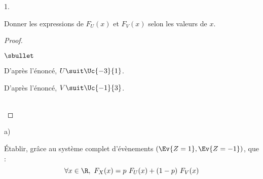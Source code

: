 \documentclass[11pt]{article}%
\begin{document}
\begin{noliste}{1.}
  \setlength{\itemsep}{4mm}
\item Donner les expressions de $F_U(x)$ et $F_V(x)$ selon les valeurs
  de $x$.

  \begin{proof}~
    \begin{noliste}{$\sbullet$}
    \item D'après l'énoncé, $U \suit \Uc{-3}{1}$.\\ %




    \item D'après l'énoncé, $V\suit \Uc{-1}{3}$. \\ %
    \end{noliste}
    ~\\[-1.4cm]
  \end{proof}

\item
  \begin{noliste}{a)}
    \setlength{\itemsep}{2mm}
  \item Établir, grâce au système complet d'évènements $\left( \Ev{Z =
        1}, \Ev{Z = -1} \right)$, que :
    \[
    \forall x\in\R, \ F_X(x) = p \ F_U(x) + (1-p) \ F_V(x)
    \]


\end{noliste}
\end{noliste}
\end{document}
